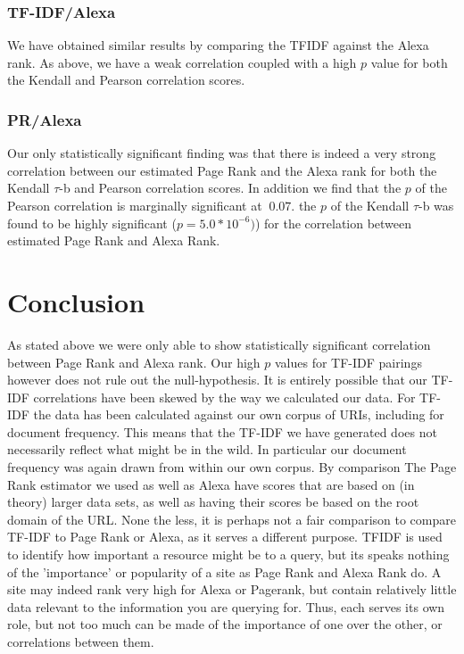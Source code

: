\documentclass[11pt]{article}
\begin{document}
	\subsubsection{TF-IDF/Alexa}
	\hspace{10mm} We have obtained similar results by comparing the TFIDF against the Alexa rank.  As above, we have a weak correlation coupled with a high $p$ value for both the Kendall and Pearson correlation scores. 
	\subsubsection{PR/Alexa}
	\hspace{10mm} Our only statistically significant finding was that there is indeed a very strong correlation between our estimated Page Rank and the Alexa rank for both the Kendall $\tau$-b and Pearson correlation scores. In addition we find that the $p$ of the Pearson correlation is marginally significant at $~0.07$. the $p$ of the Kendall $\tau$-b was found to be highly significant ($p=5.0*10^{-6})$) for the correlation between estimated Page Rank and Alexa Rank. 
	\section{Conclusion}
	\hspace{10mm} As stated above we were only able to show statistically significant correlation between Page Rank and Alexa rank. Our high $p$ values for TF-IDF pairings however does not rule out the null-hypothesis. It is entirely possible that our TF-IDF correlations have been skewed by the way we calculated our data. For TF-IDF the data has been calculated against our own corpus of URIs, including for document frequency. This means that the TF-IDF we have generated does not necessarily reflect what might be in the wild. In particular our document frequency was again drawn from within our own corpus. By comparison The Page Rank estimator we used as well as Alexa have scores that are based on (in theory) larger data sets, as well as having their scores be based on the root domain of the URL.  None the less, it is perhaps not a fair comparison to compare TF-IDF to Page Rank or Alexa, as it serves a different purpose. TFIDF is used to identify how important a resource might be to a query, but its speaks nothing of the 'importance' or popularity of a site as Page Rank and Alexa Rank do. A site may indeed rank very high for Alexa or Pagerank, but contain relatively little data relevant to the information you are querying for. Thus, each serves its own role, but not too much can be made of the importance of one over the other, or correlations between them. 
\end{document}
